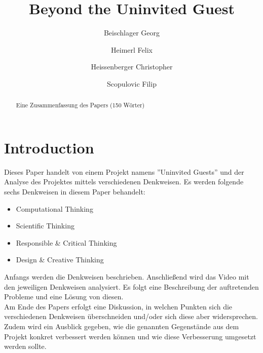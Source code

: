 \documentclass[sigchi-a, authorversion]{acmart}
\begin{document}
\title{Beyond the Uninvited Guest}

\author{Beischlager Georg}

\author{Heimerl Felix}

\author{Heissenberger Christopher}

\author{Scopulovic Filip}

\renewcommand{\shortauthors}{F. Author et al.}

\maketitle

\begin{abstract}
    Eine Zusammenfassung des Papers (150 Wörter)

\end{abstract}

\section{Introduction}

Dieses Paper handelt von einem Projekt namens ''Uninvited Guests''\cite{uninvatedGuests} und der Analyse des Projektes mittels verschiedenen Denkweisen. Es werden folgende sechs Denkweisen in diesem Paper behandelt:
\begin{itemize}
	\item Computational Thinking
	\item Scientific Thinking
	\item Responsible \& Critical Thinking
	\item Design \& Creative Thinking
\end{itemize}

Anfangs werden die Denkweisen beschrieben. Anschließend wird das Video mit den jeweiligen Denkweisen analysiert. Es folgt eine Beschreibung der auftretenden Probleme und eine Lösung von diesen.\\
Am Ende des Papers erfolgt eine Diskussion, in welchen Punkten sich die verschiedenen Denkweisen überschneiden und/oder sich diese aber widersprechen. Zudem wird ein Ausblick gegeben, wie die genannten Gegenstände aus dem Projekt\cite{uninvatedGuests} konkret verbessert werden können und wie diese Verbesserung umgesetzt werden sollte.
\end{document}
